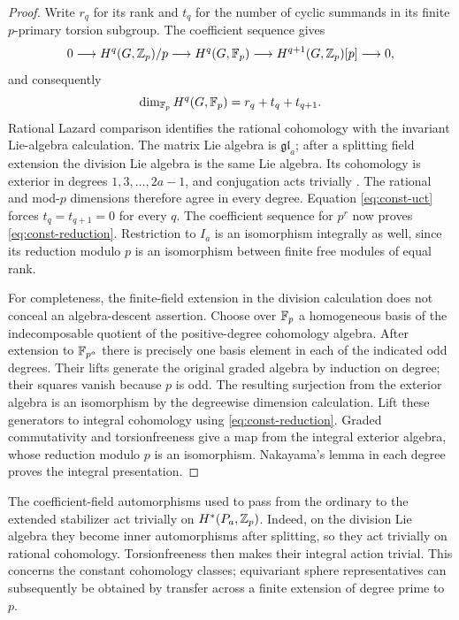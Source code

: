 \begin{proof}
Write $r_q$ for its rank and $t_q$ for the number of cyclic summands in its
finite $p$-primary torsion subgroup.  The coefficient sequence gives
\[
 0\longrightarrow H^q(G,\mathbb Z_p)/p
 \longrightarrow H^q(G,\mathbb F_p)
 \longrightarrow H^{q+1}(G,\mathbb Z_p)[p]\longrightarrow0,
\]
and consequently
\begin{equation}
 \dim_{\mathbb F_p}H^q(G,\mathbb F_p)=r_q+t_q+t_{q+1}.
 \label{eq:const-uct}
\end{equation}
Rational Lazard comparison identifies the rational cohomology with the
invariant Lie-algebra calculation.  The matrix Lie algebra is
$\mathfrak{gl}_a$; after a splitting field extension the division Lie
algebra is the same Lie algebra.  Its cohomology is exterior in degrees
$1,3,\ldots,2a-1$, and conjugation acts trivially
\cite[Proposition~3.8.1 and Lemma~3.8.2]{BSSW}.  The rational and
mod-$p$ dimensions therefore agree in every degree.  Equation
\eqref{eq:const-uct} forces $t_q=t_{q+1}=0$ for every $q$.
The coefficient sequence for $p^r$ now proves
\eqref{eq:const-reduction}.  Restriction to $I_a$ is an isomorphism
integrally as well, since its reduction modulo $p$ is an isomorphism
between finite free modules of equal rank.

For completeness, the finite-field extension in the division calculation
does not conceal an algebra-descent assertion.  Choose over $\mathbb F_p$ a
homogeneous basis of the indecomposable quotient of the positive-degree
cohomology algebra.  After extension to $\mathbb F_{p^a}$ there is precisely one
basis element in each of the indicated odd degrees.  Their lifts generate
the original graded algebra by induction on degree; their squares vanish
because $p$ is odd.  The resulting surjection from the exterior algebra is
an isomorphism by the degreewise dimension calculation.  Lift these
generators to integral cohomology using \eqref{eq:const-reduction}.
Graded commutativity and torsionfreeness give a map from the integral
exterior algebra, whose reduction modulo $p$ is an isomorphism.
Nakayama's lemma in each degree proves the integral presentation.
\end{proof}

\begin{remark}
\label{rem:const-galois}
The coefficient-field automorphisms used to pass from the ordinary to the
extended stabilizer act trivially on $H^*(P_a,\mathbb Z_p)$.  Indeed, on the
division Lie algebra they become inner automorphisms after splitting, so
they act trivially on rational cohomology.  Torsionfreeness then makes
their integral action trivial.  This concerns the constant cohomology
classes; equivariant sphere representatives can subsequently be obtained
by transfer across a finite extension of degree prime to $p$.
\end{remark}

